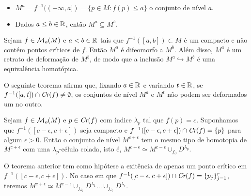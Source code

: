 \documentclass{beamer}
\begin{document}
	\begin{frame}
			\begin{itemize}
				\item $M^{a}= f^{-1}((-\infty, a]) = \{p \in M: f(p)\leq a\}$ o conjunto de nível $a$. 
				
				\item Dados $a\leq b \in \mathbb{R}^{}$, então $M^{a} \subseteq M^{b}$.
			\end{itemize}
			
			\pause
			\begin{teorema}
				Sejam $f \in \mathcal{M}_{o}(M)$ e $a<b \in \mathbb{R}^{}$ tais que $f^{-1}([a,b])\subset M$ é um compacto e não contém pontos críticos de $f$. Então $M^{a}$ é difeomorfo a $M^{b}$. Além disso, $M^{a}$ é um retrato de deformação de $M^{b}$, de modo que a inclusão  $M^{a} \hookrightarrow M^{b}$ é uma equivalência homotópica.
			\end{teorema}
			
	\end{frame}
	
	\begin{frame}
		O seguinte teorema afirma que, fixando $a \in \mathbb{R}^{}$ e variando $t \in \mathbb{R}^{}$, se $f^{-1}([a,t]) \cap \textit{Cr}(f) \neq \emptyset$, os conjuntos de nível $M^{a}$ e $M^{t}$ não podem ser deformados um no outro.
		
		\begin{teorema}
			Sejam $f\in \mathcal{M}_{o}(M)$ e $p\in \textit{Cr}(f)$ com índice $\lambda_{p}$ tal que $f(p) = c$. Suponhamos que $f^{-1}([c-\epsilon,c+\epsilon])$ seja compacto e $f^{-1}([c-\epsilon,c+\epsilon])\cap \textit{Cr}(f) = \{p\}$ para algum $\epsilon>0$. Então o conjunto de nível $M^{c+\epsilon}$ tem o mesmo tipo de homotopia de $M^{c+\epsilon}$ com uma $\lambda_{p}$-célula colada, isto é, $M^{c+\epsilon} \simeq M^{c-\epsilon}\cup_{f_{\partial}} D^{\lambda_{p}}$.
		\end{teorema}
		
		\pause
		\begin{observacao}
			O teorema anterior tem como hipótese a exitência de apenas um ponto crítico em $f^{-1}([c-\epsilon,c+\epsilon])$. No caso em que $f^{-1}([c-\epsilon,c+\epsilon]) \cap \textit{Cr}(f) = \{p_{j}\}_{j=1}^{r}$, teremos $M^{c+\epsilon} \simeq M^{c-\epsilon}\cup_{f_{\partial_{1}}} D^{\lambda_{1}}\dots  \cup_{f_{\partial_{r}}} D^{\lambda_{r}}$.
		\end{observacao}
	\end{frame}
	
\end{document}
